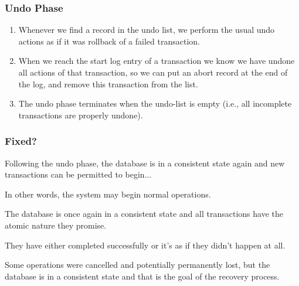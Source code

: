 \begin{frame}
\frametitle{Undo Phase}

\begin{enumerate}
	\item Whenever we find a record in the undo list, we perform the usual undo actions as if it was rollback of a failed transaction.
	\item When we reach the start log entry of a transaction we know we have undone all actions of that transaction, so we can put an abort record at the end of the log, and remove this transaction from the list.
	\item The undo phase terminates when the undo-list is empty (i.e., all incomplete transactions are properly undone).
\end{enumerate}

\end{frame}


\begin{frame}
\frametitle{Fixed?}


Following the undo phase, the database is in a consistent state again and new transactions can be permitted to begin... 

In other words, the system may begin normal operations.

The database is once again in a consistent state and all transactions have the atomic nature they promise. 

They have either completed successfully or it's as if they didn't happen at all.

Some operations were cancelled and potentially permanently lost, but the database is in a consistent state and that is the goal of the recovery process.

\end{frame}








